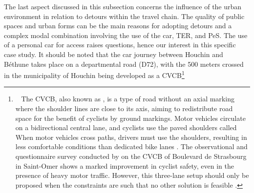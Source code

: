 \begin{refsegment}
The last aspect discussed in this subsection concerns the influence of the urban environment in relation to detours within the travel chain. The quality of public spaces and urban forms can be the main reasons for adopting detours and a complex modal combination involving the use of the car, \acrshort{TER}, and \acrshort{PeS}. The use of a personal car for access raises questions, hence our interest in this specific case study. It should be noted that the car journey between Houchin and Béthune takes place on a departmental road (D72), with the 500 meters crossed in the municipality of Houchin being developed as a \acrfull{CVCB}\footnote{~
    The \acrshort{CVCB}, also known as , is a type of road without an axial marking where the shoulder lines are close to its axis, aiming to redistribute road space for the benefit of cyclists by ground markings. Motor vehicles circulate on a bidirectional central lane, and cyclists use the paved shoulders called  When motor vehicles cross paths, drivers must use the shoulders, resulting in less comfortable conditions than dedicated bike lanes \textcolor{blue}{\autocite[24]{jouannot_mieux_2018}}. The observational and questionnaire survey conducted by \textcolor{blue}{\textcite[21]{cerema_nord_picardie_chaussee_2018}} on the \acrshort{CVCB} of Boulevard de Strasbourg in Saint-Omer shows a marked improvement in cyclist safety, even in the presence of heavy motor traffic. However, this three-lane setup should only be proposed when the constraints are such that no other solution is feasible \textcolor{blue}{\autocite[27]{jouannot_mieux_2018}}.
}
\end{refsegment}
